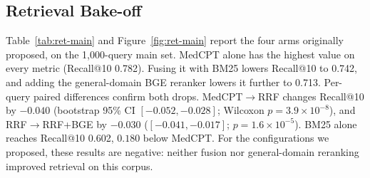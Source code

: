 \documentclass[11pt]{article}
\begin{document}
\begin{table}[t]
\centering\small
\setlength{\tabcolsep}{3pt}
\caption{Accuracy (\%) of our configuration-A baseline on a seeded stratified MIRAGE sample. SD is the binomial standard deviation. $^\dagger$GPT-3.5-16k-0613 MedRAG with MedCorp and RRF-4 on all 7,663 questions \citep[Tables 6 and 7]{xiong2024benchmarking}. \textbf{Not directly comparable}: (1) 199 vs.\ 7,663 questions; (2) our 43,246-passage corpus vs.\ MedCorp (30.4M documents / 54.2M snippets; \citealp[Table 3]{xiong2024benchmarking}); (3) Qwen2.5-7B-Instruct vs.\ GPT-3.5; (4) MedCPT alone vs.\ RRF-4. Additionally, we use 5 retrieved passages and a short explanation prompt, whereas MedRAG uses 32 snippets by default with chain-of-thought prompting.} %
\label{tab:exp1}
\end{table}

\subsection{Retrieval Bake-off}\label{sec:ret}
Table~\ref{tab:ret-main} and Figure~\ref{fig:ret-main} report the four arms originally proposed, on the 1,000-query main set. MedCPT alone has the highest value on every metric (Recall@10 0.782). Fusing it with BM25 lowers Recall@10 to 0.742, and adding the general-domain BGE reranker lowers it further to 0.713. %
Per-query paired differences confirm both drops. MedCPT$\to$RRF changes Recall@10 by $-0.040$ (bootstrap 95\% CI $[-0.052,-0.028]$; Wilcoxon $p=3.9\times10^{-8}$), and RRF$\to$RRF+BGE by $-0.030$ ($[-0.041,-0.017]$; $p=1.6\times10^{-5}$). BM25 alone reaches Recall@10 0.602, $0.180$ below MedCPT. %
For the configurations we proposed, these results are negative: neither fusion nor general-domain reranking improved retrieval on this corpus.
\end{document}
